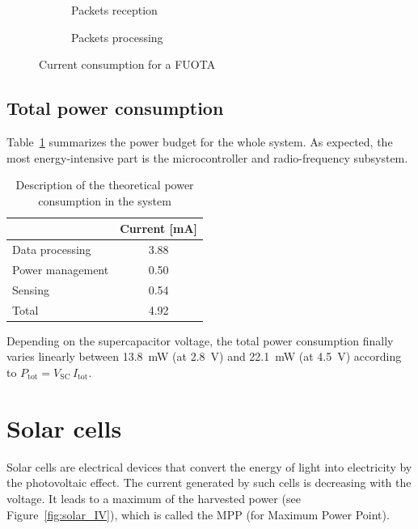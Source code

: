 \documentclass{EPL-master-thesis-covers-EN}
\newcommand{\te}[1]{\textrm{#1}}
\begin{document}
\begin{figure}[H]
\begin{subfigure}{.49\textwidth}
  \centering
  
  \caption{Packets reception}
\end{subfigure}
\begin{subfigure}{.49\textwidth}
  \centering
   
  \caption{Packets processing}
\end{subfigure}
\caption{Current consumption for a FUOTA}
\label{fig:current_consumption_MCU_RF_FUOTA}
\end{figure}


\subsection*{Total power consumption}

Table~\ref{tab:power_consumption_theor} summarizes the power budget for the whole system. As expected, the most energy-intensive part is the microcontroller and radio-frequency subsystem.


\begin{table}[H]
\centering
\begin{tabular}{lc}
\toprule
                     & Current [\si{mA}] \\ \midrule
 Data processing     & 3.88              \\
 Power management    & 0.50              \\
 Sensing             & 0.54              \\ \midrule
 Total               & 4.92              \\ \bottomrule
\end{tabular}
\caption{Description of the theoretical power consumption in the system}
\label{tab:power_consumption_theor}
\end{table}

Depending on the supercapacitor voltage, the total power consumption finally varies linearly between \SI{13.8}{mW} (at \SI{2.8}{V}) and \SI{22.1}{mW} (at \SI{4.5}{V}) according to $P_\te{tot} = V_\te{SC} \, I_\te{tot}$.


\section{Solar cells}
\label{section:solar_cells}

Solar cells are electrical devices that convert the energy of light into electricity by the photovoltaic effect. The current generated by such cells is decreasing with the voltage. It leads to a maximum of the harvested power (see Figure~\ref{fig:solar_IV}), which is called the MPP (for Maximum Power Point).
\end{document}
